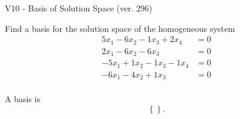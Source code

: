 \begin{exercise}
  \begin{exerciseTitle}V10 - Basis of Solution Space (ver. 296)\end{exerciseTitle}
  \begin{exerciseStatement}
    Find a basis for the solution space of the homogeneous system 
\begin{align*}
 5 x_ 1 -6 x_ 2 -1 x_ 3 + 2 x_ 4 &= 0  \\ 
  2 x_ 1 -6 x_ 2 -6 x_ 3 &= 0  \\ 
  -5 x_ 1 + 1 x_ 2 -1 x_ 3 -1 x_ 4 &= 0  \\ 
  -6 x_ 1 -4 x_ 2 + 1 x_ 3 &= 0  \\ 
 \end{align*}


 
  \end{exerciseStatement}

  \begin{exerciseAnswer}
   A basis is   
\[\left\{\right\}.\]

  


  \end{exerciseAnswer}
\end{exercise}